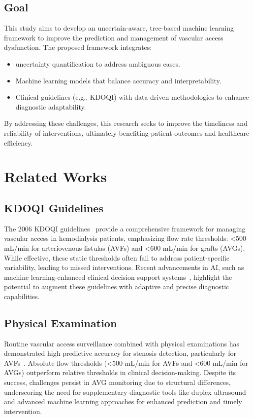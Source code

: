 \documentclass{ieeeaccess}
\begin{document}
\subsection{Goal}
This study aims to develop an uncertain-aware, tree-based machine learning framework to improve the prediction and management of vascular access dysfunction. The proposed framework integrates:
\begin{itemize}
    \item uncertainty quantification to address ambiguous cases.
    \item Machine learning models that balance accuracy and interpretability.
    \item Clinical guidelines (e.g., KDOQI) with data-driven methodologies to enhance diagnostic adaptability.
\end{itemize}
By addressing these challenges, this research seeks to improve the timeliness and reliability of interventions, ultimately benefiting patient outcomes and healthcare efficiency.

\section{Related Works}

\subsection{KDOQI Guidelines}
The 2006 KDOQI guidelines~\cite{KDOQI} provide a comprehensive framework for managing vascular access in hemodialysis patients, emphasizing flow rate thresholds: <500 mL/min for arteriovenous fistulas (AVFs) and <600 mL/min for grafts (AVGs). While effective, these static thresholds often fail to address patient-specific variability, leading to missed interventions. Recent advancements in AI, such as machine learning-enhanced clinical decision support systems~\cite{Balch_2024}, highlight the potential to augment these guidelines with adaptive and precise diagnostic capabilities.

\subsection{Physical Examination}
Routine vascular access surveillance combined with physical examinations has demonstrated high predictive accuracy for stenosis detection, particularly for AVFs~\cite{Wu}. Absolute flow thresholds (<500 mL/min for AVFs and <600 mL/min for AVGs) outperform relative thresholds in clinical decision-making. Despite its success, challenges persist in AVG monitoring due to structural differences, underscoring the need for supplementary diagnostic tools like duplex ultrasound and advanced machine learning approaches for enhanced prediction and timely intervention.
\end{document}
